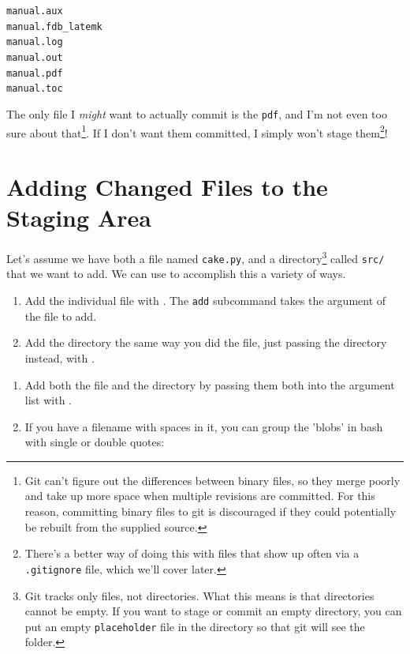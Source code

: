 \documentclass[11pt,letterpaper,twoside]{report}
\begin{document}
\begin{multicols}{3}
\noindent
\texttt{manual.aux}\\
\texttt{manual.fdb\_latemk}\\
\texttt{manual.log}\\
\texttt{manual.out}\\
\texttt{manual.pdf}\\
\texttt{manual.toc}
\end{multicols}

The only file I \emph{might} want to actually commit is the \texttt{pdf}, and
I'm not even too sure about that\footnote{Git can't figure out the differences
between binary files, so they merge poorly and take up more space when multiple
revisions are committed. For this reason, committing binary files to git is
discouraged if they could potentially be rebuilt from the supplied source.}. If
I don't want them committed, I simply won't stage them\footnote{There's a better
way of doing this with files that show up often via a \texttt{.gitignore} file,
which we'll cover later.}!

\section{Adding Changed Files to the Staging Area}
Let's assume we have both a file named \texttt{cake.py}, and a
directory\footnote{Git tracks only files, not directories. What this means is
that directories cannot be empty. If you want to stage or commit an empty
directory, you can put an empty \texttt{placeholder} file in the directory so
that git will see the folder.} called \texttt{src/} that we want to add. We can
use  to accomplish this a variety of ways.

\vspace{.5em}\noindent
{}
\begin{enumerate}
\item Add the individual file with . The \texttt{add}
    subcommand takes the argument of the file to add.
\item Add the directory the same way you did the file, just passing the
    directory instead, with .
\end{enumerate}

\noindent
{}
\begin{enumerate}
\item Add both the file and the directory by passing them both into the argument
    list with .
\item If you have a filename with spaces in it, you can group the 'blobs' in
    bash with single or double quotes:
\end{enumerate}
\end{document}
